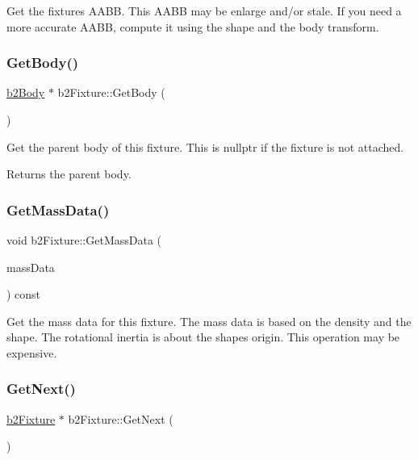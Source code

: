 Get the fixture\textquotesingle{}s A\+A\+BB. This A\+A\+BB may be enlarge and/or stale. If you need a more accurate A\+A\+BB, compute it using the shape and the body transform. \mbox{\label{classb2Fixture_a9d6536ef274d768e86ab0a8330921535}} 
\subsubsection{\texorpdfstring{Get\+Body()}{GetBody()}}
{\footnotesize\ttfamily \mbox{\hyperlink{classb2Body}{b2\+Body}} $\ast$ b2\+Fixture\+::\+Get\+Body (\begin{DoxyParamCaption}{ }\end{DoxyParamCaption})\hspace{0.3cm}{\ttfamily [inline]}}

Get the parent body of this fixture. This is nullptr if the fixture is not attached. \begin{DoxyReturn}{Returns}
the parent body. 
\end{DoxyReturn}
\mbox{\label{classb2Fixture_a4532a12e848c5ceb5a3b94cf45b7cbad}} 
\subsubsection{\texorpdfstring{Get\+Mass\+Data()}{GetMassData()}}
{\footnotesize\ttfamily void b2\+Fixture\+::\+Get\+Mass\+Data (\begin{DoxyParamCaption}\item[{\mbox{\hyperlink{structb2MassData}{b2\+Mass\+Data}} $\ast$}]{mass\+Data }\end{DoxyParamCaption}) const\hspace{0.3cm}{\ttfamily [inline]}}

Get the mass data for this fixture. The mass data is based on the density and the shape. The rotational inertia is about the shape\textquotesingle{}s origin. This operation may be expensive. \mbox{\label{classb2Fixture_a0241952461f6f1a04a3c850306390fd2}} 
\subsubsection{\texorpdfstring{Get\+Next()}{GetNext()}}
{\footnotesize\ttfamily \mbox{\hyperlink{classb2Fixture}{b2\+Fixture}} $\ast$ b2\+Fixture\+::\+Get\+Next (\begin{DoxyParamCaption}{ }\end{DoxyParamCaption})\hspace{0.3cm}{\ttfamily [inline]}}

